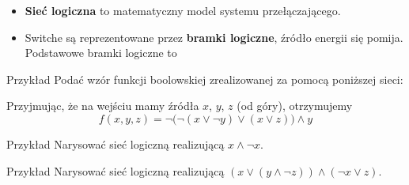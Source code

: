 \documentclass[a4paper,10pt]{beamer}
\begin{document}
\begin{frame}
	
	\begin{itemize}
		\item {\bf Sieć logiczna} to matematyczny model systemu przełączającego. 
		\item Switche są reprezentowane przez {\bf bramki logiczne}, źródło energii się pomija. Podstawowe bramki logiczne to
		
		\begin{center}
			
		\end{center}
	\end{itemize}

	\begin{exampleblock}{Przykład}
		Podać wzór funkcji boolowskiej zrealizowanej za pomocą poniższej sieci:
		
		\begin{center}
			
		\end{center}
	
	Przyjmując, że na wejściu mamy źródła $x$, $y$, $z$ (od góry), otrzymujemy
	$$f(x,y,z)=\neg\big(\neg(x\vee\neg y)\vee(x\vee z)\big)\wedge y$$ 
	\end{exampleblock}

\end{frame}


\begin{frame}
	\begin{exampleblock}{Przykład}
		Narysować sieć logiczną realizującą $x\wedge\neg x$.
	\end{exampleblock}

	\begin{exampleblock}{Przykład}
		Narysować sieć logiczną realizującą $(x\vee(y\wedge\neg z))\wedge(\neg x\vee z)$.
	\end{exampleblock}
	
\end{frame}

\end{document}
